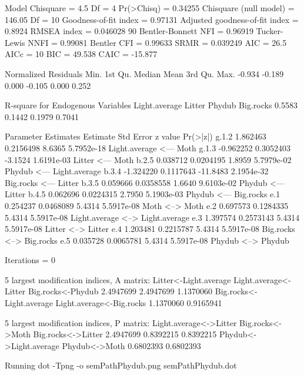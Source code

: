 \documentclass[12pt]{article}
\begin{document}
\begin{Schunk}
\begin{Soutput}
 Model Chisquare =  4.5   Df =  4 Pr(>Chisq) = 0.34255
 Chisquare (null model) =  146.05   Df =  10
 Goodness-of-fit index =  0.97131
 Adjusted goodness-of-fit index =  0.8924
 RMSEA index =  0.046028   90%
 Bentler-Bonnett NFI =  0.96919
 Tucker-Lewis NNFI =  0.99081
 Bentler CFI =  0.99633
 SRMR =  0.039249
 AIC =  26.5
 AICc =  10
 BIC =  49.538
 CAIC =  -15.877

 Normalized Residuals
   Min. 1st Qu.  Median    Mean 3rd Qu.    Max. 
 -0.934  -0.189   0.000  -0.105   0.000   0.252 

 R-square for Endogenous Variables
Light.average        Litter        Phydub     Big.rocks 
       0.5583        0.1442        0.1979        0.7041 

 Parameter Estimates
      Estimate  Std Error z value  Pr(>|z|)                                   
g.1.2  1.862463 0.2156498   8.6365 5.7952e-18 Light.average <--- Moth         
g.1.3 -0.962252 0.3052403  -3.1524 1.6191e-03 Litter <--- Moth                
b.2.5  0.038712 0.0204195   1.8959 5.7979e-02 Phydub <--- Light.average       
b.3.4 -1.324220 0.1117643 -11.8483 2.1954e-32 Big.rocks <--- Litter           
b.3.5  0.059666 0.0358558   1.6640 9.6103e-02 Phydub <--- Litter              
b.4.5  0.062696 0.0224315   2.7950 5.1903e-03 Phydub <--- Big.rocks           
e.1    0.254237 0.0468089   5.4314 5.5917e-08 Moth <--> Moth                  
e.2    0.697573 0.1284335   5.4314 5.5917e-08 Light.average <--> Light.average
e.3    1.397574 0.2573143   5.4314 5.5917e-08 Litter <--> Litter              
e.4    1.203481 0.2215787   5.4314 5.5917e-08 Big.rocks <--> Big.rocks        
e.5    0.035728 0.0065781   5.4314 5.5917e-08 Phydub <--> Phydub              

 Iterations =  0 
\end{Soutput}
\begin{Soutput}
 5 largest modification indices, A matrix:
   Litter<-Light.average    Light.average<-Litter        Big.rocks<-Phydub 
               2.4947699                2.4947699                1.1370060 
Big.rocks<-Light.average Light.average<-Big.rocks 
               1.1370060                0.9165941 

  5 largest modification indices, P matrix:
Light.average<->Litter       Big.rocks<->Moth     Big.rocks<->Litter 
             2.4947699              0.8392215              0.8392215 
Phydub<->Light.average          Phydub<->Moth 
             0.6802393              0.6802393 
\end{Soutput}
\begin{Soutput}
Running  dot -Tpng -o semPathPhydub.png  semPathPhydub.dot 
\end{Soutput}
\end{Schunk}
\end{document}
